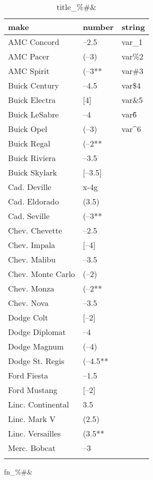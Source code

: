 \documentclass{article}
\begin{document}
\begin{table}[tbp] \centering
{}

\caption{title\_\%\#\&}
\begin{tabularx}{\linewidth}{@{}lCC@{}}

\toprule
{make}&{number}&{string} \tabularnewline
\midrule \addlinespace[\belowrulesep]
AMC Concord&--2.5&var\_1 \tabularnewline
AMC Pacer&(--3)&var\%2 \tabularnewline
AMC Spirit&(--3**&var\#3 \tabularnewline
Buick Century&--4.5&var\$4 \tabularnewline
Buick Electra&[4]&var\&5 \tabularnewline
Buick LeSabre&--4&var\~6 \tabularnewline
Buick Opel&(--3)&var\^{}6 \tabularnewline
Buick Regal&(--2**& \tabularnewline
Buick Riviera&--3.5& \tabularnewline
Buick Skylark&[--3.5]& \tabularnewline
Cad. Deville&x-4g& \tabularnewline
Cad. Eldorado&(3.5)& \tabularnewline
Cad. Seville&(--3**& \tabularnewline
Chev. Chevette&--2.5& \tabularnewline
Chev. Impala&[--4]& \tabularnewline
Chev. Malibu&--3.5& \tabularnewline
Chev. Monte Carlo&(--2)& \tabularnewline
Chev. Monza&(--2**& \tabularnewline
Chev. Nova&--3.5& \tabularnewline
Dodge Colt&[--2]& \tabularnewline
Dodge Diplomat&--4& \tabularnewline
Dodge Magnum&(--4)& \tabularnewline
Dodge St. Regis&(--4.5**& \tabularnewline
Ford Fiesta&--1.5& \tabularnewline
Ford Mustang&[--2]& \tabularnewline
Linc. Continental&3.5& \tabularnewline
Linc. Mark V&(2.5)& \tabularnewline
Linc. Versailles&(3.5**& \tabularnewline
Merc. Bobcat&--3& \tabularnewline
\bottomrule \addlinespace[\belowrulesep]

\end{tabularx}
\parbox{\linewidth}{\footnotesize fn\_\%\#\&}
\end{table}
\end{document}
